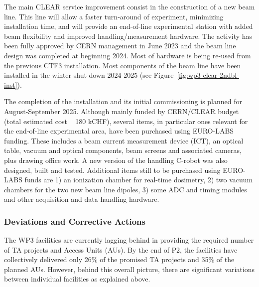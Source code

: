 {The main CLEAR service improvement consist in the construction of a new beam line. This line will allow a faster turn-around of experiment, minimizing installation time, and will provide an end-of-line experimental station with added beam flexibility and improved handling/measurement hardware. The activity has been fully approved by CERN management in June 2023 and the beam line design was completed at beginning 2024. Most of hardware is being re-used from the previous CTF3 installation. Most components of the beam line have been installed in the winter shut-down 2024-2025 (see Figure~\ref{fig:wp3-clear-2ndbl-inst}).

The completion of the installation and its initial commissioning is planned for August-September 2025. Although mainly funded by CERN/CLEAR budget (total estimated cost ~ 180 kCHF), several items, in particular ones relevant for the end-of-line experimental area, have been purchased using EURO-LABS funding. These includes a beam current measurement device (ICT), an optical table, vacuum and optical components, beam screens and associated cameras, plus drawing office work. A new version of the handling C-robot was also designed, built and tested. Additional items still to be purchased using EURO-LABS funds are 1) an ionization chamber for real-time dosimetry, 2) two vacuum chambers for the two new beam line dipoles, 3) some ADC and timing modules and other acquisition and data handling hardware.



\subsubsection*{Deviations and Corrective Actions}
\label{sec:wp3_deviations}

The WP3 facilities are currently lagging behind in providing the required number of TA projects and Access Units (AUs). By the end of P2, the facilities have collectively delivered only 26\% of the promised TA projects and 35\% of the planned AUs. However, behind this overall picture, there are significant variations between individual facilities as explained above.

}
